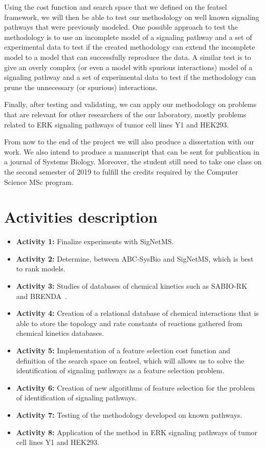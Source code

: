 Using the cost function and search space that we defined on the featsel
framework, we will then be able to test our methodology on well known
signaling pathways that were previously modeled. One possible approach 
to test the methodology is to use an incomplete model of a signaling 
pathway and a set of experimental data to test if the created 
methodology can extend the incomplete model to a model that can 
successfully reproduce the data. A similar test is to give an overly 
complex (or even a model with spurious interactions) model of a 
signaling pathway and a set of experimental data to test if the 
methodology can prune the unnecessary (or spurious) interactions. 

Finally, after testing and validating, we can apply our methodology on
problems that are relevant for other researchers of the our laboratory, 
mostly problems related to ERK signaling pathways of tumor cell lines
Y1 and HEK293.

From now to the end of the project we will also produce a dissertation
with our work. We also intend to produce a manuscript that can be sent 
for publication in a journal of Systems Biology. Moreover, the student
still need to take one class on the second semester of 2019 to fulfill
the credits required by the Computer Science MSc program. 


\section{Activities description}
\label{sec:future_activities}
\begin{itemize}
    \item{\bf Activity 1:} Finalize experiments with SigNetMS.
    \item{\bf Activity 2:} Determine, between ABC-SysBio and SigNetMS,
        which is best to rank models.
    \item{\bf Activity 3:} Studies of databases of chemical kinetics 
        such as SABIO-RK~\cite{Wittig2011} and 
        BRENDA~\cite{Schomburg2004}.
    \item{\bf Activity 4:} Creation of a relational database of chemical 
        interactions that is able to store the topology and rate 
        constants of reactions gathered from chemical kinetics 
        databases.
    \item{\bf Activity 5:} Implementation of a feature selection cost
        function and definition of the search space on featsel, which 
        will allows us to solve the identification of signaling pathways 
        as a feature selection problem.
    \item{\bf Activity 6:} Creation of new algorithms of feature 
        selection for the problem of identification of signaling 
        pathways.
    \item{\bf Activity 7:} Testing of the methodology developed on known
        pathways.
    \item{\bf Activity 8:} Application of the method in ERK signaling 
        pathways of tumor cell lines Y1 and HEK293.
\end{itemize}


